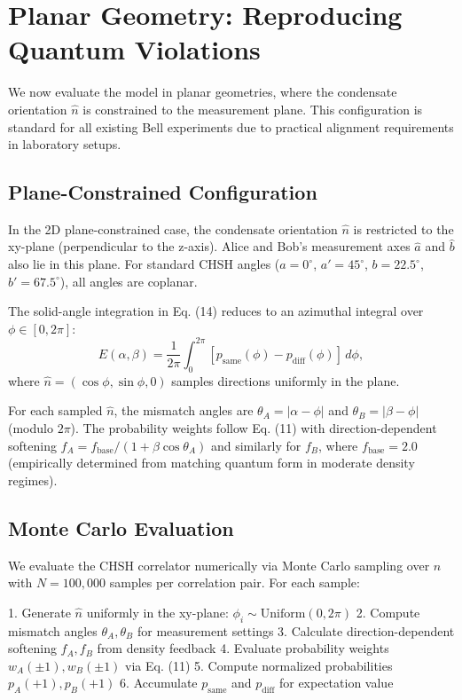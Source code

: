 \documentclass[11pt,a4paper]{article}
\theoremstyle{definition}
\theoremstyle{remark}
\begin{document}
\section{Planar Geometry: Reproducing Quantum Violations}
\label{P8:sec:planar_geometry}

We now evaluate the model in planar geometries, where the condensate orientation $\hat{n}$ is constrained to the measurement plane. This configuration is standard for all existing Bell experiments due to practical alignment requirements in laboratory setups.

\subsection{Plane-Constrained Configuration}

In the 2D plane-constrained case, the condensate orientation $\hat{n}$ is restricted to the xy-plane (perpendicular to the z-axis). Alice and Bob's measurement axes $\hat{a}$ and $\hat{b}$ also lie in this plane. For standard CHSH angles ($a=0^\circ$, $a'=45^\circ$, $b=22.5^\circ$, $b'=67.5^\circ$), all angles are coplanar.

The solid-angle integration in Eq. (14) reduces to an azimuthal integral over $\phi \in [0, 2\pi]$:
\begin{equation}
E(\alpha, \beta) = \frac{1}{2\pi} \int_0^{2\pi} [p_{\mathrm{same}}(\phi) - p_{\mathrm{diff}}(\phi)] \, d\phi,
\label{P8:eq:E_planar}
\end{equation}
where $\hat{n} = (\cos\phi, \sin\phi, 0)$ samples directions uniformly in the plane.

For each sampled $\hat{n}$, the mismatch angles are $\theta_A = |\alpha - \phi|$ and $\theta_B = |\beta - \phi|$ (modulo $2\pi$). The probability weights follow Eq. (11) with direction-dependent softening $f_A = f_{\mathrm{base}} / (1 + \beta \cos\theta_A)$ and similarly for $f_B$, where $f_{\mathrm{base}} = 2.0$ (empirically determined from matching quantum form in moderate density regimes).

\subsection{Monte Carlo Evaluation}

We evaluate the CHSH correlator numerically via Monte Carlo sampling over $\hat{n}$ with $N=100{,}000$ samples per correlation pair. For each sample:

1. Generate $\hat{n}$ uniformly in the xy-plane: $\phi_i \sim \mathrm{Uniform}(0, 2\pi)$
2. Compute mismatch angles $\theta_A, \theta_B$ for measurement settings
3. Calculate direction-dependent softening $f_A, f_B$ from density feedback
4. Evaluate probability weights $w_A(\pm 1), w_B(\pm 1)$ via Eq. (11)
5. Compute normalized probabilities $p_A(+1), p_B(+1)$
6. Accumulate $p_{\mathrm{same}}$ and $p_{\mathrm{diff}}$ for expectation value
\end{document}

